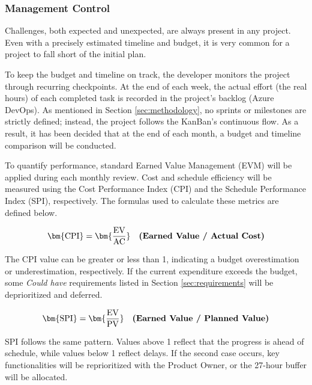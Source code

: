 \subsubsection{Management Control}

Challenges, both expected and unexpected, are always present in any project. Even with a precisely estimated timeline and budget, it is very common for a project to fall short of the initial plan. 

To keep the budget and timeline on track, the developer monitors the project through recurring checkpoints. At the end of each week, the actual effort (the real hours) of each completed task is recorded in the project’s backlog (Azure DevOps). As mentioned in Section \ref{sec:methodology}, no sprints or milestones are strictly defined; instead, the project follows the KanBan’s continuous flow. As a result, it has been decided that at the end of each month, a budget and timeline comparison will be conducted.

To quantify performance, standard Earned Value Management (EVM) will be applied during each monthly review. Cost and schedule efficiency will be measured using the Cost Performance Index (CPI) and the Schedule Performance Index (SPI), respectively. The formulas used to calculate these metrics are defined below. 

\vspace{-10pt}

\[
\bm{\mathrm{CPI}} = \bm{\frac{\mathrm{EV}}{\mathrm{AC}}}
\quad \text{\bfseries (Earned Value / Actual Cost)}
\]

\vspace{-5pt}


The CPI value can be greater or less than 1, indicating a budget overestimation or underestimation, respectively. If the current expenditure exceeds the budget, some \textit{Could have} requirements listed in Section \ref{sec:requirements} will be deprioritized and deferred.

\vspace{-10pt}
\[
\bm{\mathrm{SPI}} = \bm{\frac{\mathrm{EV}}{\mathrm{PV}}}
\quad \text{\bfseries (Earned Value / Planned Value)}
\]

\vspace{-5pt}

SPI follows the same pattern. Values above 1 reflect that the progress is ahead of schedule, while values below 1 reflect delays. If the second case occurs, key functionalities will be reprioritized with the Product Owner, or the 27-hour buffer will be allocated.

